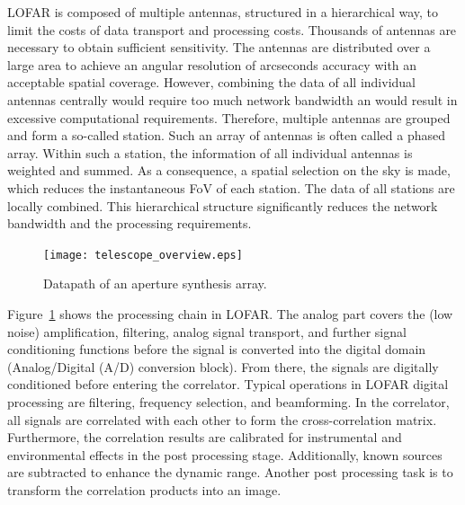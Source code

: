 \documentclass[journal]{IEEEtran}
\begin{document}

LOFAR is composed of multiple antennas, structured in a hierarchical way,
to limit the costs of data transport and processing costs.
Thousands of antennas are necessary to obtain sufficient sensitivity.
The antennas are distributed over a large area to achieve an angular
resolution of arcseconds accuracy with an acceptable spatial coverage.
However, combining the data of all individual antennas centrally would
require too much network bandwidth an would result in excessive computational
requirements.
Therefore, multiple antennas are grouped and form a so-called station.
Such an array of antennas is often called a phased array.
Within such a station, the information of all individual antennas is weighted
and summed.
As a consequence, a spatial selection on the sky is made, which reduces the
instantaneous FoV of each station. 
The data of all stations are locally combined.
This hierarchical structure significantly reduces the network bandwidth and
the processing requirements.

\begin{figure}
\begin{center}
\texttt{[image: telescope\_overview.eps]}
\end{center}
\caption{Datapath of an aperture synthesis array.}
\label{fig:concept}
\end{figure}

Figure~\ref{fig:concept} shows the processing chain in LOFAR.
The analog part covers the (low noise) amplification, filtering, analog signal
transport, and further signal conditioning functions before the signal is
converted into the digital domain (Analog/Digital (A/D) conversion block).
From there, the signals are digitally conditioned before entering the correlator. Typical operations in LOFAR digital processing are filtering, frequency selection, and beamforming. In the correlator, all signals are correlated with each other to form the cross-correlation matrix. Furthermore, the correlation results are calibrated for instrumental and environmental effects in the post processing stage. Additionally, known sources are subtracted to enhance the dynamic range. Another post processing task is to transform the correlation products into an image.
\end{document}
